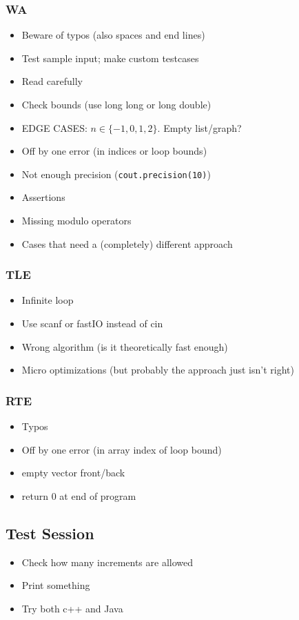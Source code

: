 \documentclass[
	a4paper,
	landscape,
	10pt,
	article
]{article}
\begin{document}
\subsubsection*{WA}
\begin{itemize}
	\setlength\itemsep{0em}
	\item Beware of typos (also spaces and end lines)
	\item Test sample input; make custom testcases
	\item Read carefully
	\item Check bounds (use long long or long double)
	\item EDGE CASES: $n\in\{-1,0,1,2\}$. Empty list/graph?
	\item Off by one error (in indices or loop bounds)
	\item Not enough precision (\texttt{cout.precision(10)})
	\item Assertions
	\item Missing modulo operators
	\item Cases that need a (completely) different approach
\end{itemize}

\subsubsection*{TLE}
\begin{itemize}
	\setlength\itemsep{0em}
	\item Infinite loop
	\item Use scanf or fastIO instead of cin
	\item Wrong algorithm (is it theoretically fast enough)
	\item Micro optimizations (but probably the approach just isn't right)
\end{itemize}

\subsubsection*{RTE}
\begin{itemize}
	\setlength\itemsep{0em}
	\item Typos
	\item Off by one error (in array index of loop bound)
	\item empty vector front/back
	\item return 0 at end of program
\end{itemize}

\subsection*{Test Session}
\begin{itemize}
	\setlength\itemsep{0em}
	\item Check how many increments are allowed
	\item Print something
	\item Try both c++ and Java
\end{itemize}
\end{document}
